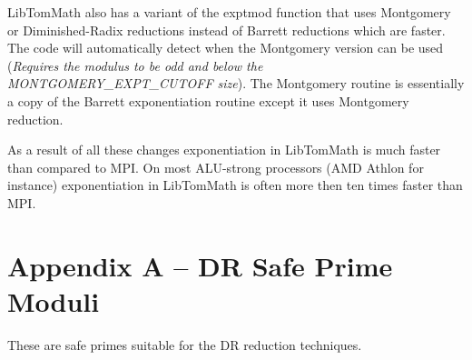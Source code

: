 \documentclass{article}
\begin{document}
LibTomMath also has a variant of the exptmod function that uses Montgomery or Diminished-Radix reductions instead of 
Barrett reductions which are faster.  The code will automatically detect when the Montgomery version can be used 
(\textit{Requires the modulus to be odd and below the MONTGOMERY\_EXPT\_CUTOFF size}).  The Montgomery routine is 
essentially a copy of the Barrett exponentiation routine except it uses Montgomery reduction.

As a result of all these changes exponentiation in LibTomMath is much faster than compared to MPI.  On most ALU-strong
processors (AMD Athlon for instance) exponentiation in LibTomMath is often more then ten times faster than MPI.

\newpage
\section*{Appendix A -- DR Safe Prime Moduli}
These are safe primes suitable for the DR reduction techniques.
\end{document}
